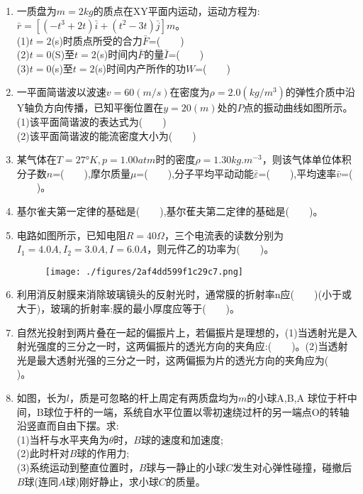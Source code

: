 \begin{enumerate}
\item 一质盘为$m=2kg$的质点在XY平面内运动，运动方程为:$\bar r =[(-t^3+2t)\bar i+(t^2-3t)\bar j]m$。\\
(1)$t=2$(s)时质点所受的合力$\bar F$=($\qquad$)\\
(2)$t=0$(S)至$t=2$(s)时间内$\bar F$的量$\bar I$=($\qquad$)\\
(3)$t=0$(s)至$t=2$(s)时间内产所作的功$W$=($\qquad$)
\item 一平面简谐波以波速$v=60(m/s)$在密度为$\rho=2.0(kg/m^3)$的弹性介质中沿Y轴负方向传播，已知平衡位置在$y=20(m)$处的$P$点的振动曲线如图所示。\\
(1)该平面简谐波的表达式为($\qquad$)\\
(2)该平面简谐波的能流密度大小为($\qquad$)
\item 某气体在$T=27$°$K,p=1.00atm$时的密度$\rho=1.30kg.m^{-3}$，则该气体单位体积分子数$n$=($\qquad$),摩尔质量$\mu$=($\qquad$),分子平均平动动能$\bar \varepsilon$=($\qquad$),平均速率$\bar v$=($\qquad$)。
\item 基尔雀夫第一定律的基础是($\qquad$),基尔萑夫第二定律的基础是($\qquad$)。
\item 电路如图所示，已知电阻$R=40\Omega$，三个电流表的读数分别为$I_1=4.0A,I_2=3.0A,I=6.0A$，则元件乙的功率为($\qquad$)。
\begin{figure}[ht]
\centering
\texttt{[image: ./figures/2af4dd599f1c29c7.png]}
\caption{} \label{fig_SD02_1}
\end{figure}
\item 利用消反射膜来消除玻璃镜头的反射光时，通常膜的折射率n应($\qquad$)(小于或大于)，玻璃的折射率:膜的最小厚度应等于($\qquad$)。
\item 自然光投射到两片叠在一起的偏振片上，若偏振片是理想的，(1)当透射光是入射光强度的三分之一时，这两偏振片的透光方向的夹角应:($\qquad$)。(2)当透射光是最大透射光强的三分之一时，这两偏振为片的透光方向的夹角应为($\qquad$)。
\item 如图，长为$l$，质是可忽略的杆上周定有两质盘均为$m$的小球A,B,A 球位于杆中间，B球位于杆的一端，系统自水平位置以零初速绕过杆的另一端点O的转轴沿竖直而自由下摆。求:\\
(1)当杆与水平夹角为$\theta$时，$B$球的速度和加速度;\\
(2)此时杆对$B$球的作用力;\\
(3)系统运动到整直位置时，$B$球与一静止的小球$C$发生对心弹性碰撞，碰撤后$B$球(连同$A$球)刚好静止，求小球$C$的质量。
\end{enumerate}
